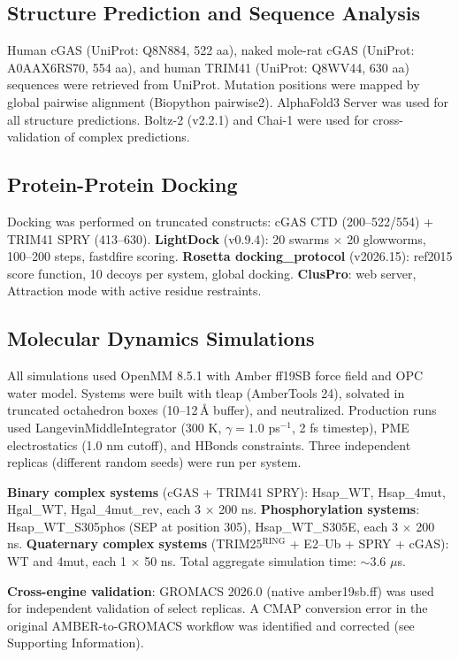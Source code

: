 \documentclass[journal=jcisd8, manuscript=article]{achemso}
\begin{document}
\subsection{Structure Prediction and Sequence Analysis}

Human cGAS (UniProt: Q8N884, 522 aa), naked mole-rat cGAS (UniProt: A0AAX6RS70, 554 aa), and human TRIM41 (UniProt: Q8WV44, 630 aa) sequences were retrieved from UniProt. Mutation positions were mapped by global pairwise alignment (Biopython pairwise2). AlphaFold3 Server was used for all structure predictions. Boltz-2 (v2.2.1) and Chai-1 were used for cross-validation of complex predictions.

\subsection{Protein-Protein Docking}

Docking was performed on truncated constructs: cGAS CTD (200--522/554) + TRIM41 SPRY (413--630). \textbf{LightDock} (v0.9.4): 20 swarms $\times$ 20 glowworms, 100--200 steps, fastdfire scoring. \textbf{Rosetta docking\_protocol} (v2026.15): ref2015 score function, 10 decoys per system, global docking. \textbf{ClusPro}: web server, Attraction mode with active residue restraints.

\subsection{Molecular Dynamics Simulations}

All simulations used OpenMM 8.5.1 with Amber ff19SB force field and OPC water model. Systems were built with tleap (AmberTools 24), solvated in truncated octahedron boxes (10--12\,\AA{} buffer), and neutralized. Production runs used LangevinMiddleIntegrator (300 K, $\gamma = 1.0$ ps$^{-1}$, 2 fs timestep), PME electrostatics (1.0 nm cutoff), and HBonds constraints. Three independent replicas (different random seeds) were run per system.

\textbf{Binary complex systems} (cGAS + TRIM41 SPRY): Hsap\_WT, Hsap\_4mut, Hgal\_WT, Hgal\_4mut\_rev, each 3 $\times$ 200 ns. \textbf{Phosphorylation systems}: Hsap\_WT\_S305phos (SEP at position 305), Hsap\_WT\_S305E, each 3 $\times$ 200 ns. \textbf{Quaternary complex systems} (TRIM25$^{\text{RING}}$ + E2--Ub + SPRY + cGAS): WT and 4mut, each 1 $\times$ 50 ns. Total aggregate simulation time: $\sim$3.6 $\mu$s.

\textbf{Cross-engine validation}: GROMACS 2026.0 (native amber19sb.ff) was used for independent validation of select replicas. A CMAP conversion error in the original AMBER-to-GROMACS workflow was identified and corrected (see Supporting Information).
\end{document}
